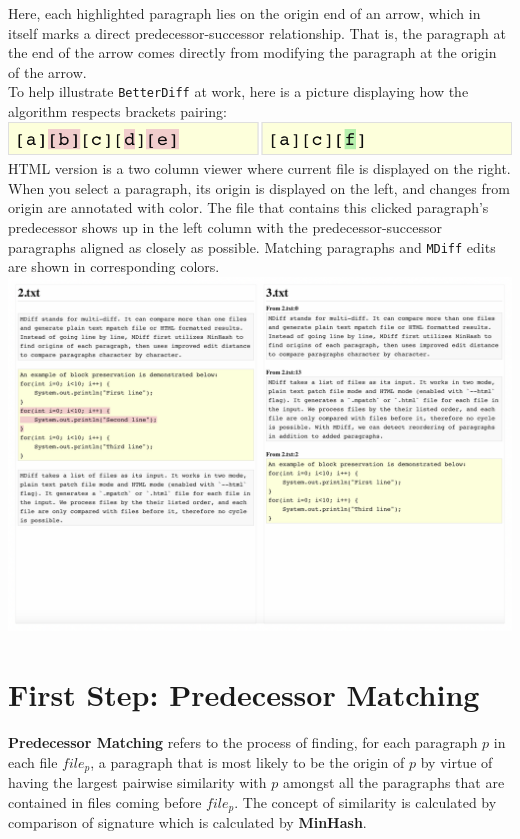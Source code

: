 \documentclass{article}
\begin{document}
Here, each highlighted paragraph lies on the origin end of an arrow, which in itself marks a direct predecessor-successor relationship. That is, the paragraph at the end of the arrow comes directly from modifying the paragraph at the origin of the arrow.\\

To help illustrate \texttt{BetterDiff} at work, here is a picture displaying how the algorithm respects brackets pairing:\\
\includegraphics[center]{Screenshot1.png}\\

HTML version is a two column viewer where current file is displayed on the right. When you select a paragraph, its origin is displayed on the left, and changes from origin are annotated with color. The file that contains this clicked paragraph's predecessor shows up in the left column with the predecessor-successor paragraphs aligned as closely as possible. Matching paragraphs and \texttt{MDiff} edits are shown in corresponding colors. \\
\includegraphics[scale=0.4,center]{Screenshot.png}\\

\pagebreak
\section{First Step: Predecessor Matching}
\textbf{Predecessor Matching} refers to the process of finding, for each paragraph $p$ in each file $file_p$, a paragraph that is most likely to be the origin of $p$ by virtue of having the largest pairwise similarity with $p$ amongst all the paragraphs that are contained in files coming before $file_p$. The concept of similarity is calculated by comparison of signature which is calculated by \textbf{MinHash}.
\end{document}
